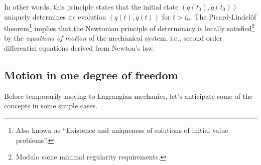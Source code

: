 \documentclass[english,fontsize=11pt,paper=a5,oneside]{scrbook}
\theoremstyle{definition}
\begin{document}
In other words, this principle states that the initial state $\left(q(t_0), \dot q(t_0)\right)$ uniquely determines its evolution $\left(q(t),\dot q(t)\right)$ for $t > t_0$.
The Picard-Lindel\"of theorem\footnote{Also known as ``Existence and uniqueness of solutions of initial value problems''.} implies that the Newtonian principle of determinacy is locally satisfied\footnote{Modulo some minimal regularity requirements.} by the \emph{equations of motion} of the mechanical system, i.e., second order differential equations derived from Newton's law.

\subsection{Motion in one degree of freedom}

Before temporarily moving to Lagrangian mechanics, let's anticipate some of the concepts in some simple cases.
\end{document}
